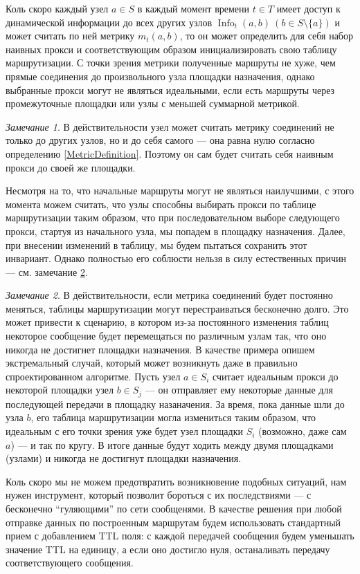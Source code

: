 \documentclass{article}
\theoremstyle{plain}
\theoremstyle{plain}
\theoremstyle{plain}
\theoremstyle{plain}
\theoremstyle{definition}
\theoremstyle{remark}
\newtheorem{remark}{Замечание}[section]
\theoremstyle{plain}
\DeclareMathOperator*{\info}{Info}
\begin{document}
Коль скоро каждый узел $a \in S$ в каждый момент времени $t \in T$ имеет доступ к динамической информации до всех других узлов $\info_t(a, b)\ (b \in S \setminus \{a\})$ и может считать по ней метрику $m_t(a, b)$, то он может определить для себя набор наивных прокси и соответствующим образом инициализировать свою таблицу маршрутизации. С точки зрения метрики полученные маршруты не хуже, чем прямые соединения до произвольного узла площадки назначения, однако выбранные прокси могут не являться идеальными, если есть маршруты через промежуточные площадки или узлы с меньшей суммарной метрикой.

\begin{remark}
\label{SelfRouting}
    В действительности узел может считать метрику соединений не только до других узлов, но и до себя самого --- она равна нулю согласно определению \ref{MetricDefinition}. Поэтому он сам будет считать себя наивным прокси до своей же площадки.
\end{remark}

Несмотря на то, что начальные маршруты могут не являться наилучшими, с этого момента можем считать, что узлы способны выбирать прокси по таблице маршрутизации таким образом, что при последовательном выборе следующего прокси, стартуя из начального узла, мы попадем в площадку назначения. Далее, при внесении изменений в таблицу, мы будем пытаться сохранить этот инвариант. Однако полностью его соблюсти нельзя в силу естественных причин --- см. замечание \ref{InfinityLoops}.

\begin{remark}
\label{InfinityLoops}
    В действительности, если метрика соединений будет постоянно меняться, таблицы маршрутизации могут перестраиваться бесконечно долго. Это может привести к сценарию, в котором из-за постоянного изменения таблиц некоторое сообщение будет перемещаться по различным узлам так, что оно никогда не достигнет площадки назначения. В качестве примера опишем экстремальный случай, который может возникнуть даже в правильно спроектированном алгоритме. Пусть узел $a \in S_i$ считает идеальным прокси до некоторой площадки узел $b \in S_j$ --- он отправляет ему некоторые данные для последующей передачи в площадку назаначения. За время, пока данные шли до узла $b$, его таблица маршрутизации могла измениться таким образом, что идеальным с его точки зрения уже будет узел площадки $S_i$ (возможно, даже сам $a$) --- и так по кругу. В итоге данные будут ходить между двумя площадками (узлами) и никогда не достигнут площадки назначения.
    
    Коль скоро мы не можем предотвратить возникновение подобных ситуаций, нам нужен инструмент, который позволит бороться с их последствиями --- с бесконечно \enquote{гуляющими} по сети сообщенями. В качестве решения при любой отправке данных по построенным маршрутам будем использовать стандартный \cite[с.~2]{RFC0791} прием с добавлением TTL поля: с каждой передачей сообщения будем уменьшать значение TTL на единицу, а если оно достигло нуля, останаливать передачу соответствующего сообщения.
\end{remark}
\end{document}
